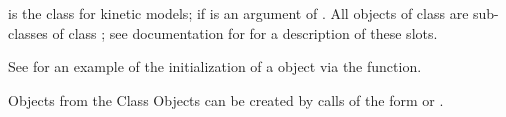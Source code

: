\begin{Description}\relax
{} is the class for kinetic models; if  is an 
argument of .
All objects of class  are sub-classes of 
class ; see documentation for  
for a description of 
these slots.
\end{Description}
\begin{Details}\relax
See  for an 
example of the initialization of a 
 object via the  function.
\end{Details}
\begin{Section}{Objects from the Class}
Objects can be created by calls of the form  or 
.
\end{Section}
